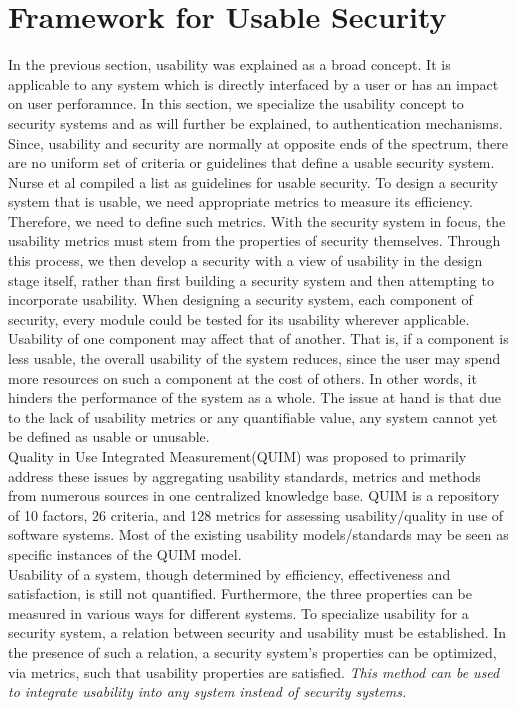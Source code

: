 \section{Framework for Usable Security}
In the previous section, usability was explained as a broad concept. It is applicable to any system which is directly interfaced by a user or has an impact on user perforamnce. In this section, we specialize the usability concept to security systems and as will further be explained, to authentication mechanisms.\\ Since, usability and security are normally at opposite ends of the spectrum, there are no uniform set of criteria or guidelines that define a usable security system. Nurse et al\cite{nurse2011guidelines} 
compiled a list as guidelines for usable security.
\newline
To design a security system that is usable, we need appropriate metrics to measure its efficiency. Therefore, we need to define such metrics. With the security system in focus, the usability metrics must stem from the properties of security themselves. Through this process, we then develop a security with a view of usability in the design stage itself, rather than first building a security system and then attempting to incorporate usability. When designing a security system, each component of security, every module could be tested for its usability wherever applicable. Usability of one component may affect that of another. That is, if a component is less usable, the overall usability of the system reduces, since the user may spend more resources on such a component at the cost of others. In other words, it hinders the performance of the system as a whole. The issue at hand is that due to the lack of usability metrics or any quantifiable value, any system cannot yet be defined as usable or unusable. \\


Quality in Use Integrated Measurement(QUIM)\cite{seffah2001quim} was proposed to primarily address these issues by aggregating usability standards, metrics and methods from numerous sources in one centralized knowledge base. QUIM is a repository of 10 factors, 26 criteria, and 128 metrics for assessing usability/quality in use of software systems. Most of the existing usability models/standards may be seen as specific instances of the QUIM model. \\

Usability of a system, though determined by efficiency, effectiveness and satisfaction, is still not quantified. Furthermore, the three properties can be measured in various ways for different systems. To specialize usability for a security system, a relation between security and usability must be established. In the presence of such a relation, a security system's properties can be optimized, via metrics, such that usability properties are satisfied. \textit{This method can be used to integrate usability into any system instead of security systems.} \\ 

